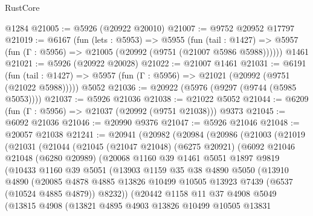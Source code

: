 \begin{lexlean}{RustCore}
\begin{coremodule}
    @1284
@21005 := @5926 (@20922 @20010)
@21007 := @9752 @20952 @17797
@21019 := @6167
    (fun (lets : @5953) =>
    @5955
      (fun (tail : @1427) =>
      @5957 (fun (Γ : @5956) => @21005 (@20992 (@9751 (@21007 @5986 @5988))))))
    @1461
@21021 := @5926 (@20922 @20028)
@21022 := @21007 @1461
@21031 := @6191
    (fun (tail : @1427) => @5957 (fun (Γ : @5956) => @21021 (@20992 (@9751 (@21022 @5988)))))
    @5052
@21036 := @20922 (@5976 (@9297 (@9744 (@5985 @5053))))
@21037 := @5926 @21036
@21038 := @21022 @5052
@21044 := @6209 (fun (Γ : @5956) => @21037 (@20992 (@9751 @21038))) @9373
@21045 := @6092 @21036
@21046 := @20990 @9376
@21047 := @5926 @21046
@21048 := @20057 @21038
@21241 := @20941
    (@20982
      (@20984
        (@20986
          (@21003
            (@21019
              (@21031
                (@21044
                  (@21045
                    (@21047 @21048)
                    (@6275 @20921)
                    (@6092
                      @21046
                      @21048
                      (@6280 @20989)
                      (@20068
                        @1160
                        @39
                        @1461
                        @5051
                        @1897
                        @9819
                        (@10433
                          @1160
                          @39
                          @5051
                          (@13903
                            @1159
                            @35
                            @38
                            @4890
                            @5050
                            (@13910
                              @4890
                              (@20085
                                @4878
                                @4885
                                @13826
                                @10499
                                @10505
                                @13923
                                @7439
                                (@6537 (@10524 @4885 @4879))
                                @8232))
                            (@20442
                              @1158
                              @11
                              @37
                              @4908
                              @5049
                              (@13815
                                @4908
                                (@13821
                                  @4895
                                  @4903
                                  @13826
                                  @10499
                                  @10505
                                  @13831

\end{coremodule}
\end{lexlean}
